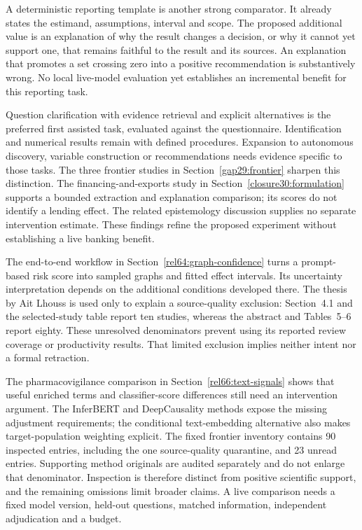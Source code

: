 A deterministic reporting template is another strong comparator. It already
states the estimand, assumptions, interval and scope. The proposed additional
value is an explanation of why the result changes a decision, or why it
cannot yet support one, that remains faithful to the result and its sources.
An explanation that promotes a set crossing zero into a positive recommendation
is substantively wrong. No local live-model evaluation yet establishes an
incremental benefit for this reporting task.

Question clarification with evidence retrieval and explicit alternatives is
the preferred first assisted task, evaluated against the questionnaire.
Identification and numerical results remain with defined procedures. Expansion
to autonomous discovery, variable construction or recommendations needs
evidence specific to those tasks. The three frontier studies in
Section~\ref{gap29:frontier} sharpen this distinction. The financing-and-exports
study in Section~\ref{closure30:formulation} supports a bounded extraction and
explanation comparison; its scores do not identify a lending effect. The
related epistemology discussion supplies no separate intervention estimate.
These findings refine the proposed experiment without establishing a live
banking benefit. \citep{rel18li,rel18mugleston}

The end-to-end workflow in Section~\ref{rel64:graph-confidence} turns a
prompt-based risk score into sampled graphs and fitted effect intervals. Its
uncertainty interpretation depends on the additional conditions developed
there. The thesis by Ait Lhouss is used only to explain a source-quality
exclusion: Section~4.1 and the selected-study table report ten studies, whereas
the abstract and Tables~5--6 report eighty. These unresolved denominators
prevent using its reported review coverage or productivity results. That
limited exclusion implies neither intent nor a formal retraction.
\citep{rel64molero,rel64aitlhouss}

The pharmacovigilance comparison in Section~\ref{rel66:text-signals} shows
that useful enriched terms and classifier-score differences still need an
intervention argument. The InferBERT and DeepCausality methods expose the
missing adjustment requirements; the conditional text-embedding alternative
also makes target-population weighting explicit. The fixed frontier inventory
contains 90 inspected entries, including the one source-quality quarantine,
and 23 unread entries. Supporting method originals are audited separately
and do not enlarge that denominator. Inspection is therefore distinct from
positive scientific support, and the remaining omissions limit broader claims.
A live comparison needs a fixed model version, held-out questions, matched
information, independent adjudication and a budget. \citep{rel66pharma,rel66inferbert,rel66deepcausality,rel66veitch}




